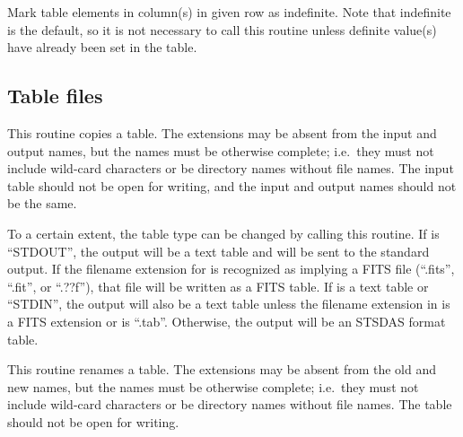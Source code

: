 Mark table elements in column(s) in given row as indefinite.
Note that indefinite is the default, so it is not necessary to call this
routine unless definite value(s) have already been set in the table.

\callseqtable

\subsection{Table files}

\begin{callseq}
\end{callseq}

This routine copies a table.
The extensions may be absent from the input and output names,
but the names must be otherwise complete;
i.e.~they must not include wild-card characters
or be directory names without file names.
The input table should not be open for writing,
and the input and output names
should not be the same.

To a certain extent,
the table type can be changed by calling this routine.
If  is ``STDOUT'',
the output will be a text table
and will be sent to the standard output.
If the filename extension for 
is recognized as implying a FITS file
(``.fits'', ``.fit'', or ``.??f''),
that file will be written as a FITS table.
If  is a text table or ``STDIN'',
the output will also be a text table unless
the filename extension in 
is a FITS extension or is ``.tab''.
Otherwise, the output will be an STSDAS format table.

\callseqtable

\begin{callseq}
\end{callseq}

This routine renames a table.
The extensions may be absent from the old and new names,
but the names must be otherwise complete;
i.e.~they must not include wild-card characters
or be directory names without file names.
The table should not be open for writing.

